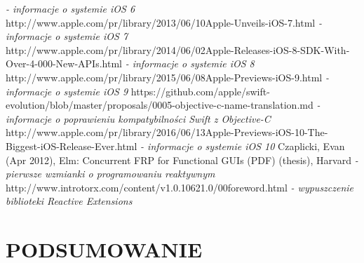\documentclass[11pt,twoside,a4paper]{report}
\begin{document}
\begin{thebibliography}{50}
\emph{ - informacje o systemie iOS 6}
http://www.apple.com/pr/library/2013/06/10Apple-Unveils-iOS-7.html
\emph{ - informacje o systemie iOS 7}
http://www.apple.com/pr/library/2014/06/02Apple-Releases-iOS-8-SDK-With-Over-4-000-New-APIs.html
\emph{ - informacje o systemie iOS 8}
http://www.apple.com/pr/library/2015/06/08Apple-Previews-iOS-9.html
\emph{ - informacje o systemie iOS 9}
https://github.com/apple/swift-evolution/blob/master/proposals/0005-objective-c-name-translation.md
\emph{ - informacje o poprawieniu kompatybilności Swift z Objective-C}
http://www.apple.com/pr/library/2016/06/13Apple-Previews-iOS-10-The-Biggest-iOS-Release-Ever.html
\emph{ - informacje o systemie iOS 10}
 Czaplicki, Evan (Apr 2012), Elm: Concurrent FRP for Functional GUIs (PDF) (thesis), Harvard
\emph{ - pierwsze wzmianki o programowaniu reaktywnym}
 http://www.introtorx.com/content/v1.0.10621.0/00foreword.html
\emph{ - wypuszczenie biblioteki Reactive Extensions}

\end{thebibliography}
\chapter{PODSUMOWANIE}
\end{document}
